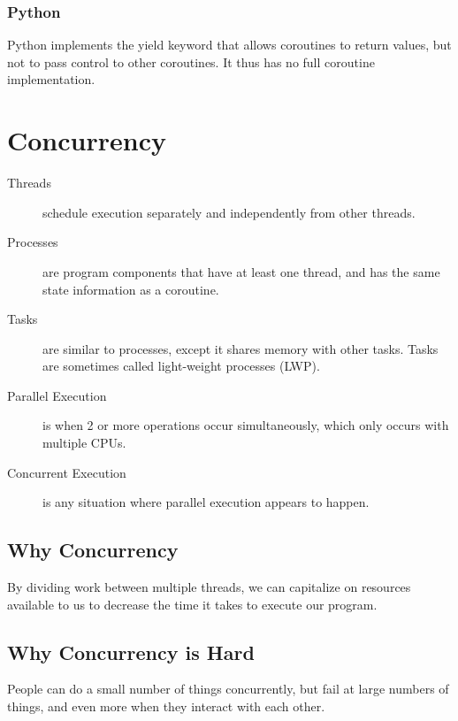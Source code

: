             \subsection{Python} %
            \label{sub:python}
                Python implements the yield keyword that allows coroutines to return values, but not to pass control to other coroutines.
                It thus has no full coroutine implementation.

    \chapter{Concurrency} %
    \label{cha:concurrency}
        \begin{description}
            \item[Threads] schedule execution separately and independently from other threads.
            \item[Processes] are program components that have at least one thread, and has the same state information as a coroutine.
            \item[Tasks] are similar to processes, except it shares memory with other tasks.
            Tasks are sometimes called light-weight processes (LWP).
            \item[Parallel Execution] is when 2 or more operations occur simultaneously, which only occurs with multiple CPUs.
            \item[Concurrent Execution] is any situation where parallel execution appears to happen.
        \end{description}
        \section{Why Concurrency} %
        \label{sec:why_concurrency}
            By dividing work between multiple threads, we can capitalize on resources available to us to decrease the time it takes to execute our program.
        \section{Why Concurrency is Hard} %
        \label{sec:why_concurrency_is_hard}
            People can do a small number of things concurrently, but fail at large numbers of things, and even more when they interact with each other.

